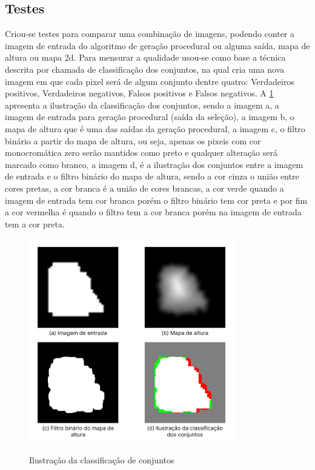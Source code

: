 \subsection{Testes}

Criou-se testes para comparar uma combinação de imagens, podendo conter a imagem de entrada do algoritmo de geração procedural ou alguma saída, mapa de altura ou mapa 2d. Para mensurar a qualidade usou-se como base a técnica descrita por  chamada de classificação dos conjuntos, na qual cria uma nova imagem em que cada pixel será de algum conjunto dentre quatro: Verdadeiros positivos, Verdadeiros negativos, Falsos positivos e Falsos negativos. A \cref{fig:representacao} apresenta a ilustração da classificação dos conjuntos, sendo a imagem a, a imagem de entrada para geração procedural (saída da seleção), a imagem b, o mapa de altura que é uma das saídas da geração procedural, a imagem c, o filtro binário a partir do mapa de altura, ou seja, apenas os pixeis com cor monocromática zero serão mantidos como preto e qualquer alteração será marcado como branco, a imagem d, é a ilustração dos conjuntos entre a imagem de entrada e o filtro binário do mapa de altura, sendo a cor cinza o união entre cores pretas, a cor branca é a união de cores brancas, a cor verde quando a imagem de entrada tem cor branca porém o filtro binário tem cor preta e por fim a cor vermelha é quando o filtro tem a cor branca porém na imagem de entrada tem a cor preta.

\begin{figure}[!ht]
	\centering
    \caption{Ilustração da classificação de conjuntos}
	\includegraphics[width=0.8\textwidth]{figures/representacao_classificacao.png}
	\label{fig:representacao}
\end{figure}

